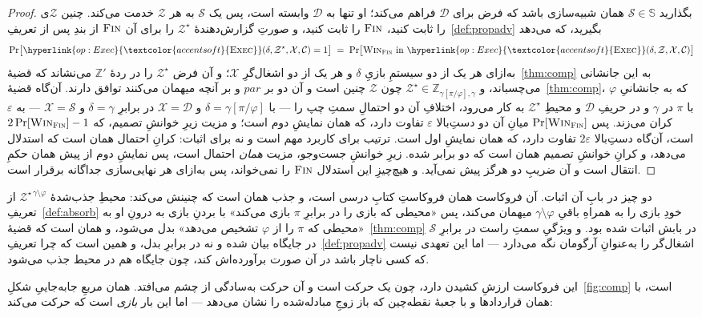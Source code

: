 \documentclass[10pt,oneside,openany]{book}
\newcommand{\pars}{\mathit{par}}
\newcommand{\Corr}{\mathcal{C}}
\newcommand{\Zenv}{\mathcal{Z}}
\newcommand{\Dum}{\mathcal{D}}
\newcommand{\Sim}{\mathcal{S}}
\newcommand{\SimSet}{\mathbb{S}}
\newcommand{\ZenvSet}{\mathbb{Z}}
\newcommand{\op}[1]{\textnormal{\textsc{#1}}}
\newcommand{\opl}[1]{\hyperlink{op:#1}{\textcolor{accentsoft}{\op{#1}}}}
\newcommand{\Win}{\op{Win}}
\theoremstyle{accentdef}
\theoremstyle{accentplain}
\begin{document}
\begin{proof}
بگذارید $\Sim \in \SimSet$ همان شبیه‌سازی باشد که فرض برای $\Dum$ فراهم
می‌کند؛ او تنها به $\Dum$ وابسته است، پس یک $\Sim$ به هر $\Zenv$ خدمت
می‌کند. چنین $\Zenv$ی را ثابت کنید، $\op{Fin}$ را ثابت کنید، و صورتِ
گزارش‌دهندهٔ $\Zenv^{\star}$ را برای آن $\op{Fin}$ از بندِ پس از
تعریفِ~\ref{def:propadv} بگیرید، که می‌دهد
\[
  \Pr\bigl[\opl{Exec}(\delta,\Zenv^{\star},\mathcal{X},\Corr) = 1\bigr]
  \;=\;
  \Pr\bigl[\Win_{\op{Fin}} \ \text{in} \ \opl{Exec}(\delta,\Zenv,\mathcal{X},\Corr)\bigr]
\]
به‌ازای هر یک از دو سیستمِ بازیِ $\delta$ و هر یک از دو اشغال‌گرِ
$\mathcal{X}$؛ و آن فرض $\Zenv^{\star}$ را در ردهٔ $\ZenvSet'$ می‌نشاند که
قضیهٔ~\ref{thm:comp} به این جانشانی می‌چسباند، و $\Zenv^{\star} \in
\ZenvSet_{\gamma[\pi/\varphi],\gamma}$ چون $\Zenv$ چنین است و آن دو بر
$\pars$ و بر آنچه میهمان می‌کنند توافق دارند. آن‌گاه
قضیهٔ~\ref{thm:comp}، که به جانشانیِ $\varphi$ با $\pi$ در $\gamma$ و در
حریفِ $\Dum$ و محیطِ $\Zenv^{\star}$ به کار می‌رود، اختلافِ آن دو احتمالِ
سمتِ چپ را --- با $\delta = \gamma[\pi/\varphi]$ و $\mathcal{X} = \Dum$ در
برابرِ $\delta = \gamma$ و $\mathcal{X} = \Sim$ --- به $\varepsilon$ کران
می‌زند. پس $\Pr[\Win_{\op{Fin}}]$ میانِ آن دو دستِ‌بالا $\varepsilon$
تفاوت دارد، که همان نمایشِ دوم است؛ و مزیت زیرِ خوانشِ تصمیم، که
$2\Pr[\Win_{\op{Fin}}]-1$ است، آن‌گاه دستِ‌بالا $2\varepsilon$ تفاوت
دارد، که همان نمایشِ اول است. ترتیب برای کاربرد مهم است و نه برای اثبات:
کرانِ احتمال همان است که استدلال می‌دهد، و کرانِ خوانشِ تصمیم همان است که
دو برابر شده. زیرِ خوانشِ جست‌وجو، مزیت \emph{همان} احتمال است، پس نمایشِ
دوم از پیش همان حکمِ انتقال است و آن ضریبِ دو هرگز پیش نمی‌آید. و
هیچ‌چیزِ این استدلال $\op{Fin}$ را نمی‌خواند، پس به‌ازای هر نهایی‌سازی
جداگانه برقرار است.
\end{proof}

دو چیز در بابِ آن اثبات. آن فروکاست همان فروکاستِ کتابِ درسی است، و جذب
همان است که چنینش می‌کند: محیطِ جذب‌شدهٔ $\Zenv^{\star\,\gamma \setminus
\varphi}$ از تعریفِ~\ref{def:absorb} خودِ بازی را به همراهِ باقیِ $\gamma
\setminus \varphi$ میهمان می‌کند، پس «محیطی که بازی را در برابرِ $\pi$ بازی
می‌کند» با بردنِ بازی به درونِ او به «محیطی که $\pi$ را از $\varphi$ تشخیص
می‌دهد» بدل می‌شود، و همان است که قضیهٔ~\ref{thm:comp} در بابش اثبات شده
بود. و ویژگیِ سمتِ راست در برابرِ $\Sim$ در جایگاه بیان شده و نه در برابرِ
بدل، و همین است که چرا تعریفِ~\ref{def:propadv} اشغال‌گر را به‌عنوانِ
آرگومان نگه می‌دارد --- اما این تعهدی نیست که کسی ناچار باشد در آن صورت
برآورده‌اش کند، چون جایگاه هم در محیط جذب می‌شود.

این فروکاست ارزشِ کشیدن دارد، چون یک حرکت است و آن حرکت به‌سادگی از چشم
می‌افتد. همان مربعِ جابه‌جاییِ شکلِ~\ref{fig:comp} است، با همان قراردادها و
با جعبهٔ نقطه‌چین که باز زوجِ مبادله‌شده را نشان می‌دهد --- اما این بار
\emph{بازی} است که حرکت می‌کند:
\end{document}
